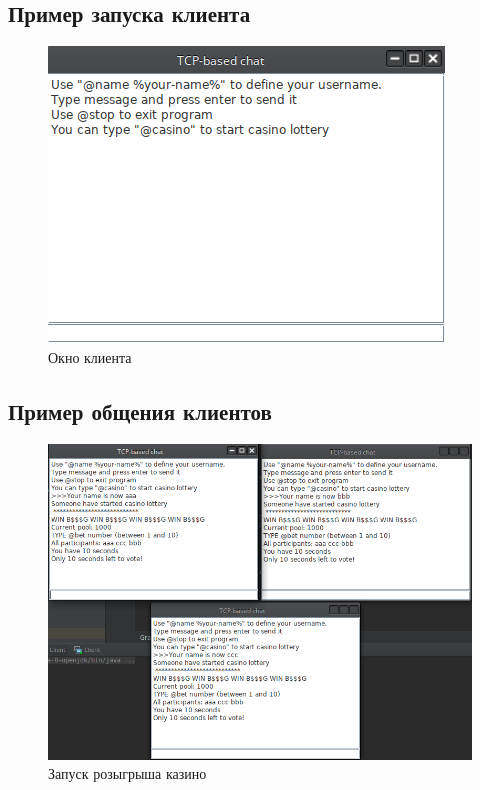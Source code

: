 \documentclass{article}
\begin{document}
\subsection{Пример запуска клиента}
\begin{figure}[H]
	\begin{flushleft}
		\centerline{\includegraphics[scale=0.8]{chat1.png}}
		\caption{Окно клиента}
	\end{flushleft}
\end{figure}

\subsection{Пример общения клиентов}
\begin{figure}[H]
	\begin{flushleft}
		\centerline{\includegraphics[scale=0.6]{chat2.png}}
		\caption{Запуск розыгрыша казино}
	\end{flushleft}
\end{figure}
\end{document}
